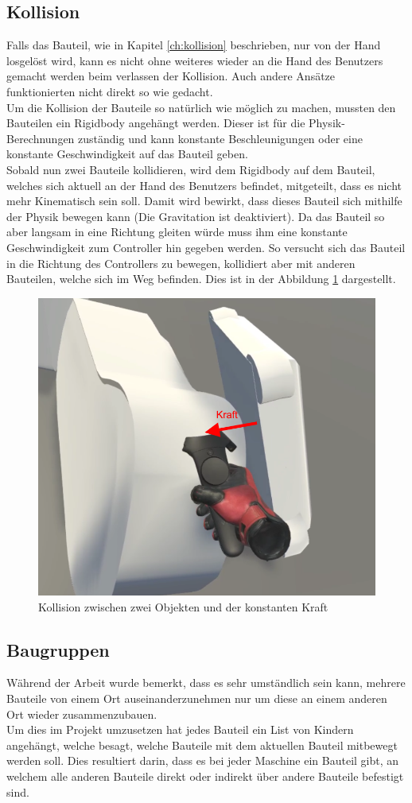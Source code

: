 \subsection{Kollision}
Falls das Bauteil, wie in Kapitel \ref{ch:kollision} beschrieben, nur von der Hand losgelöst wird, kann es nicht ohne weiteres wieder an die Hand des Benutzers gemacht werden beim verlassen der Kollision. Auch andere Ansätze funktionierten nicht direkt so wie gedacht. \\

\noindent Um die Kollision der Bauteile so natürlich wie möglich zu machen, mussten den Bauteilen ein Rigidbody angehängt werden. Dieser ist für die Physik-Berechnungen zuständig und kann konstante Beschleunigungen oder eine konstante Geschwindigkeit auf das Bauteil geben. \\
Sobald nun zwei Bauteile kollidieren, wird dem Rigidbody auf dem Bauteil, welches sich aktuell an der Hand des Benutzers befindet, mitgeteilt, dass es nicht mehr Kinematisch sein soll. Damit wird bewirkt, dass dieses Bauteil sich mithilfe der Physik bewegen kann (Die Gravitation ist deaktiviert). Da das Bauteil so aber langsam in eine Richtung gleiten würde muss ihm eine konstante Geschwindigkeit zum Controller hin gegeben werden. So versucht sich das Bauteil in die Richtung des Controllers zu bewegen, kollidiert aber mit anderen Bauteilen, welche sich im Weg befinden. Dies ist in der Abbildung \ref{fig:collision} dargestellt.

\begin{figure}[h!]
	\centering
	\includegraphics[keepaspectratio,width=0.4\linewidth]{img/Kollision.PNG}
	\caption{Kollision zwischen zwei Objekten und der konstanten Kraft}
	\label{fig:collision}
\end{figure}

\subsection{Baugruppen}
Während der Arbeit wurde bemerkt, dass es sehr umständlich sein kann, mehrere Bauteile von einem Ort auseinanderzunehmen nur um diese an einem anderen Ort wieder zusammenzubauen. \\
Um dies im Projekt umzusetzen hat jedes Bauteil ein List von Kindern angehängt, welche besagt, welche Bauteile mit dem aktuellen Bauteil mitbewegt werden soll. Dies resultiert darin, dass es bei jeder Maschine ein Bauteil gibt, an welchem alle anderen Bauteile direkt oder indirekt über andere Bauteile befestigt sind.

